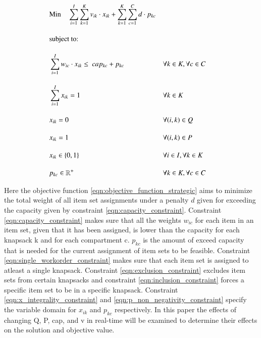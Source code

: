 \documentclass[preprint,12pt,authoryear]{elsarticle}
\begin{document}
\begin{alignat}{2}
	& \text{Min} \quad \sum_{i = 1}^{I} \sum_{k = 1}^{K} v_{ik} \cdot x_{ik} + \sum_{k = 1}^{K} \sum_{c = 1}^C d \cdot p_{kc}   \label{eqn:objective_function_strategic} \\[1em]
    & \text{subject to:} \notag                                                                                                                                        \\[1em]
	& \sum_{i=1}^I w_{ic} \cdot x_{ik} \leq \ cap_{kc} + p_{kc}        && \forall k \in K, \forall c \in C                      \label{eqn:capacity_constraint}          \\[1em]
	& \sum_{i = 1}^{I} x_{ik} = 1                                      && \forall k \in K                                       \label{eqn:single_workorder_constraint}  \\[1em]
	& x_{ik} = 0                                                       && \forall (i, k) \in Q                                  \label{eqn:exclusion_constraint}         \\[1em]
	& x_{ik} = 1                                                       && \forall (i, k) \in P                                  \label{eqn:inclusion_constraint}         \\[1em]
	& x_{ik} \in \{0, 1\}                                              && \forall i \in I, \forall k \in K                      \label{eqn:x_integrality_constraint}     \\[1em] 
	& p_{kc} \in \mathbb{R}^{+}                                        && \forall k \in K, \forall c \in C                      \label{eqn:p_non_negativity_constraint}
\end{alignat}

Here the objective function \ref{eqn:objective_function_strategic} aims to minimize the total weight of all item set assignments under a penalty $d$ given for exceeding the 
capacity given by constraint \ref{eqn:capacity_constraint}. Constraint \ref{eqn:capacity_constraint} makes sure that all the weights $w_{ic}$ for each item in an item set, given that it
has been assigned, is lower than the capacity for each knapsack k and for each compartment c. $p_{kc}$ is the amount of exceed capacity that is needed for the current assignment of item sets to be feasible.
Constraint \ref{eqn:single_workorder_constraint} makes sure that each item set is assigned to atleast a single knapsack. Constraint \ref{eqn:exclusion_constraint} excludes item sets from 
certain knapsacks and constraint \ref{eqn:inclusion_constraint}  forces a specific item set to be in a specific knapsack. Constraint \ref{eqn:x_integrality_constraint} and \ref{eqn:p_non_negativity_constraint} 
specify the variable domain for $x_{ik}$ and $p_{kc}$ respectively. In this paper the effects of changing Q, P, cap, and v in real-time will be examined to determine their effects on the solution and objective value.
\end{document}
